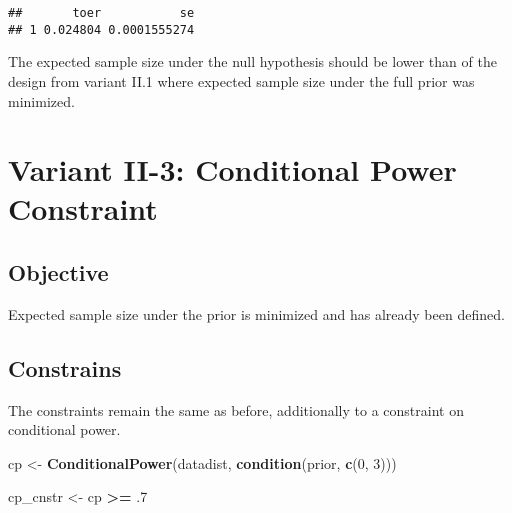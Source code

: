\documentclass[]{book}
\newenvironment{Shaded}{\begin{snugshade}}{\end{snugshade}}
\newcommand{\DecValTok}[1]{\textcolor[rgb]{0.00,0.00,0.81}{#1}}
\newcommand{\FloatTok}[1]{\textcolor[rgb]{0.00,0.00,0.81}{#1}}
\newcommand{\KeywordTok}[1]{\textcolor[rgb]{0.13,0.29,0.53}{\textbf{#1}}}
\newcommand{\NormalTok}[1]{#1}
\newcommand{\OperatorTok}[1]{\textcolor[rgb]{0.81,0.36,0.00}{\textbf{#1}}}
\newcommand{\StringTok}[1]{\textcolor[rgb]{0.31,0.60,0.02}{#1}}
\begin{document}
\begin{verbatim}
##       toer           se
## 1 0.024804 0.0001555274
\end{verbatim}

The expected sample size under the null hypothesis should be lower
than of the design from variant II.1 where expected sample size under
the full prior was minimized.

\begin{Shaded}
\end{Shaded}

\hypertarget{variantII_3}{%
\section{Variant II-3: Conditional Power Constraint}\label{variantII_3}}

\hypertarget{objective-5}{%
\subsection{Objective}\label{objective-5}}

Expected sample size under the prior is minimized and has already been defined.

\hypertarget{constrains-5}{%
\subsection{Constrains}\label{constrains-5}}

The constraints remain the same as before, additionally to a constraint
on conditional power.

\begin{Shaded}
\begin{Highlighting}[]
\NormalTok{cp <-}\StringTok{ }\KeywordTok{ConditionalPower}\NormalTok{(datadist, }\KeywordTok{condition}\NormalTok{(prior, }\KeywordTok{c}\NormalTok{(}\DecValTok{0}\NormalTok{, }\DecValTok{3}\NormalTok{)))}

\NormalTok{cp_cnstr <-}\StringTok{ }\NormalTok{cp }\OperatorTok{>=}\StringTok{ }\FloatTok{.7}
\end{Highlighting}
\end{Shaded}
\end{document}
